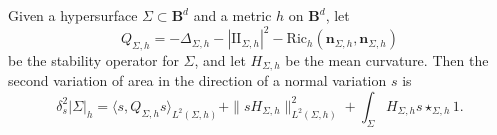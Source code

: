\documentclass[reqno,11pt]{amsart}
\newcommand{\Ball}{\mathbf{B}}
\newcommand{\Two}{\mathrm{I\!I}}
\newcommand{\normal}{\mathbf n}
\newcommand{\Ell}{\mathrm{Ell}}
\newcommand{\Ric}{\mathrm{Ric}}
\newtheorem{lemma}[theorem]{Lemma}
\theoremstyle{definition}
\numberwithin{equation}{section}
\begin{document}

Given a hypersurface $\Sigma \subset \Ball^d$ and a metric $h$ on $\Ball^d$, let
\begin{equation}\label{stability formula}
Q_{\Sigma, h} = -\Delta_{\Sigma, h} - |\Two_{\Sigma, h}|^2 - \Ric_h(\normal_{\Sigma, h}, \normal_{\Sigma, h})
\end{equation}
be the stability operator for $\Sigma$, and let $H_{\Sigma, h}$ be the mean curvature.
Then the second variation of area in the direction of a normal variation $s$ is \cite[Theorem 1.3]{Chodosh21}
\begin{equation}\label{second variation formula}
\delta^2_s |\Sigma|_h = \langle s, Q_{\Sigma, h} s\rangle_{L^2(\Sigma, h)} + \|sH_{\Sigma, h}\|_{L^2(\Sigma, h)}^2 + \int_\Sigma H_{\Sigma, h} s \star_{\Sigma, h} 1.
\end{equation}
\end{document}
